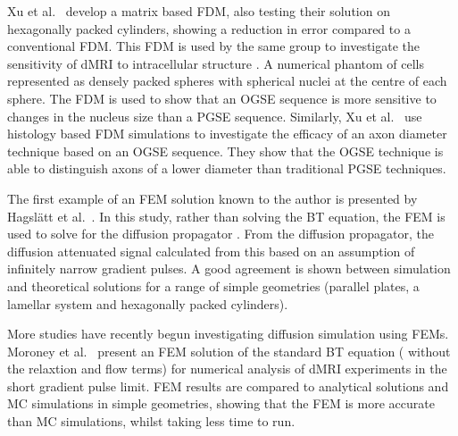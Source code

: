 Xu et al.\ \cite{Xu2007} develop a matrix based \ac{FDM}, also testing their solution on hexagonally packed cylinders, showing a reduction in error compared to a conventional FDM.
This \ac{FDM} is used by the same group to investigate the sensitivity of \ac{dMRI} to intracellular structure \cite{Xu2009}.
A numerical phantom of cells represented as densely packed spheres with spherical nuclei at the centre of each sphere.
The FDM is used to show that an \ac{OGSE} sequence is more sensitive to changes in the nucleus size than a \ac{PGSE} sequence.
Similarly, Xu et al.\ \cite{Xu2014} use histology based \ac{FDM} simulations to investigate the efficacy of an axon diameter technique based on an \ac{OGSE} sequence. They show that the \ac{OGSE} technique is able to distinguish axons of a lower diameter than traditional \ac{PGSE} techniques. 

The first example of an \ac{FEM} solution known to the author is presented by Hagsl\"att et al.\ \cite{Hagslatt2003}.
In this study, rather than solving the \ac{BT} equation, the \ac{FEM} is used to solve for the diffusion propagator \cite{Callaghan1991,Price1997}. From the diffusion propagator, the diffusion attenuated signal calculated from this based on an assumption of infinitely narrow gradient pulses.
A good agreement is shown between simulation and theoretical solutions for a range of simple geometries (parallel plates, a lamellar system and  hexagonally packed cylinders).

More studies have recently begun investigating diffusion simulation using \acp{FEM}.
Moroney et al.\ \cite{Moroney2013} present an \ac{FEM} solution of the standard \ac{BT} equation ( without the relaxtion and flow terms) for numerical analysis of \ac{dMRI} experiments in the short gradient pulse limit. \ac{FEM} results are compared to analytical solutions and \ac{MC} simulations in simple geometries, showing that the \ac{FEM} is more accurate than \ac{MC} simulations, whilst taking less time to run.

